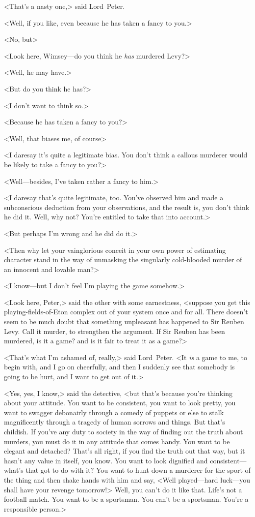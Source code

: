 <That's a nasty one,> said Lord~Peter.

<Well, if you like, even because he has taken a fancy to you.>

<No, but\longdash>

<Look here, Wimsey—do you think he \textit{has} murdered Levy?>

<Well, he may have.>

<But do you think he has?>

<I don't want to think so.>

<Because he has taken a fancy to you?>

<Well, that biases me, of course\longdash>

<I daresay it's quite a legitimate bias. You don't think a callous murderer would be likely to take a fancy to you?>

<Well—besides, I've taken rather a fancy to him.>

<I daresay that's quite legitimate, too. You've observed him and made a subconscious deduction from your observations, and the result is, you don't think he did it. Well, why not? You're entitled to take that into account.>

<But perhaps I'm wrong and he did do it.>

<Then why let your vainglorious conceit in your own power of estimating character stand in the way of unmasking the singularly cold-blooded murder of an innocent and lovable man?>

<I know—but I don't feel I'm playing the game somehow.>

<Look here, Peter,> said the other with some earnestness, <suppose you get this playing-fields-of-Eton complex out of your system once and for all. There doesn't seem to be much doubt that something unpleasant has happened to Sir Reuben Levy. Call it murder, to strengthen the argument. If Sir Reuben has been murdered, is it a game? and is it fair to treat it as a game?>

<That's what I'm ashamed of, really,> said Lord~Peter. <It \textit{is} a game to me, to begin with, and I go on cheerfully, and then I suddenly see that somebody is going to be hurt, and I want to get out of it.>

<Yes, yes, I know,> said the detective, <but that's because you're thinking about your attitude. You want to be consistent, you want to look pretty, you want to swagger debonairly through a comedy of puppets or else to stalk magnificently through a tragedy of human sorrows and things. But that's childish. If you've any duty to society in the way of finding out the truth about murders, you must do it in any attitude that comes handy. You want to be elegant and detached? That's all right, if you find the truth out that way, but it hasn't any value in itself, you know. You want to look dignified and consistent—what's that got to do with it? You want to hunt down a murderer for the sport of the thing and then shake hands with him and say, <Well played—hard luck—you shall have your revenge tomorrow!> Well, you can't do it like that. Life's not a football match. You want to be a sportsman. You can't be a sportsman. You're a responsible person.>

